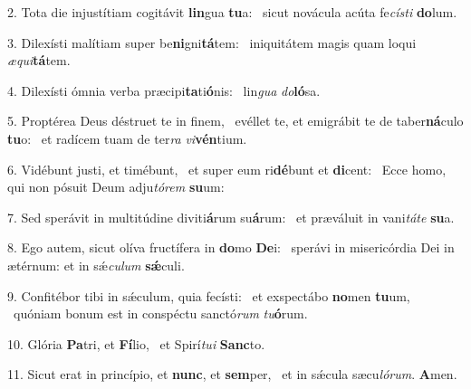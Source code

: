 2. Tota die injustítiam cogitávit \textbf{lin}gua \textbf{tu}a: \ast\  sicut novácula acúta fe\textit{cís}\textit{ti} \textbf{do}lum.\

3. Dilexísti malítiam super be\textbf{ni}gni\textbf{tá}tem: \ast\  iniquitátem magis quam loqui \textit{æ}\textit{qui}\textbf{tá}tem.\

4. Dilexísti ómnia verba præcipi\textbf{ta}ti\textbf{ó}nis: \ast\  lin\textit{gua} \textit{do}\textbf{ló}sa.\

5. Proptérea Deus déstruet te in finem, \dag\  evéllet te, et emigrábit te de taber\textbf{ná}culo \textbf{tu}o: \ast\  et radícem tuam de ter\textit{ra} \textit{vi}\textbf{vén}tium.\

6. Vidébunt justi, et timébunt, \dag\  et super eum ri\textbf{dé}bunt et \textbf{di}cent: \ast\  Ecce homo, qui non pósuit Deum adju\textit{tó}\textit{rem} \textbf{su}um:\

7. Sed sperávit in multitúdine diviti\textbf{á}rum su\textbf{á}rum: \ast\  et præváluit in vani\textit{tá}\textit{te} \textbf{su}a.\

8. Ego autem, sicut olíva fructífera in \textbf{do}mo \textbf{De}i: \ast\  sperávi in misericórdia Dei in ætérnum: et in sǽ\textit{cu}\textit{lum} \textbf{sǽ}culi.\

9. Confitébor tibi in sǽculum, quia fecísti: \dag\  et exspectábo \textbf{no}men \textbf{tu}um, \ast\  quóniam bonum est in conspéctu sanctó\textit{rum} \textit{tu}\textbf{ó}rum.\

10. Glória \textbf{Pa}tri, et \textbf{Fí}lio, \ast\  et Spirí\textit{tu}\textit{i} \textbf{Sanc}to.\

11. Sicut erat in princípio, et \textbf{nunc}, et \textbf{sem}per, \ast\  et in sǽcula sæcu\textit{ló}\textit{rum}. \textbf{A}men.\


